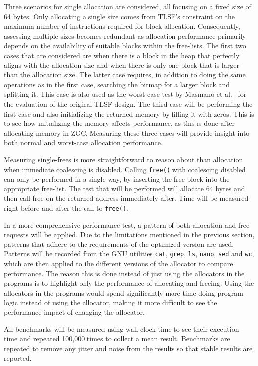 Three scenarios for single allocation are considered, all focusing on a fixed size of 64 bytes. Only allocating a single size comes from TLSF's constraint on the maximum number of instructions required for block allocation. Consequently, assessing multiple sizes becomes redundant as allocation performance primarily depends on the availability of suitable blocks within the free-lists. The first two cases that are considered are when there is a block in the heap that perfectly aligns with the allocation size and when there is only one block that is larger than the allocation size. The latter case requires, in addition to doing the same operations as in the first case, searching the bitmap for a larger block and splitting it. This case is also used as the worst-case test by Masmano et al.~\cite{TLSF} for the evaluation of the original TLSF design. The third case will be performing the first case and also initializing the returned memory by filling it with zeros. This is to see how initializing the memory affects performance, as this is done after allocating memory in ZGC. Measuring these three cases will provide insight into both normal and worst-case allocation performance.

Measuring single-frees is more straightforward to reason about than allocation when immediate coalescing is disabled. Calling \texttt{free()} with coalescing disabled can only be performed in a single way, by inserting the free block into the appropriate free-list. The test that will be performed will allocate 64 bytes and then call free on the returned address immediately after. Time will be measured right before and after the call to \texttt{free()}.

In a more comprehensive performance test, a pattern of both allocation and free requests will be applied. Due to the limitations mentioned in the previous section, patterns that adhere to the requirements of the optimized version are used. Patterns will be recorded from the GNU utilities  \texttt{cat}, \texttt{grep}, \texttt{ls}, \texttt{nano}, \texttt{sed} and \texttt{wc}, which are then applied to the different versions of the allocator to compare performance. The reason this is done instead of just using the allocators in the programs is to highlight only the performance of allocating and freeing. Using the allocators in the programs would spend significantly more time doing program logic instead of using the allocator, making it more difficult to see the performance impact of changing the allocator.

All benchmarks will be measured using wall clock time to see their execution time and repeated 100,000 times to collect a mean result. Benchmarks are repeated to remove any jitter and noise from the results so that stable results are reported.


